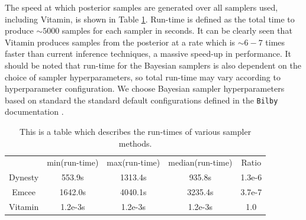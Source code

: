 \documentclass[%
showpacs,
 amsmath,amssymb,
 aps,
 twocolumn,
 prl,
 reprint,
floatfix,
]{revtex4-1}
\newcommand{\chris}[1]{\textbf{\textcolor{red}{CHRIS: #1}}}
\begin{document}
The speed at which posterior samples are generated over all samplers used, 
including Vitamin, is shown in Table \ref{Tab:speed}. Run-time is 
defined as the total time to produce $\sim 5000$ samples for each 
sampler in seconds. It can be clearly seen that Vitamin produces 
samples from the posterior at a rate which is $\sim 6 - 7$ times 
faster than current inference techniques, a massive speed-up 
in performance. It should be noted 
that run-time for the Bayesian samplers is also dependent on 
the choice of sampler hyperparameters, so total run-time may 
vary according to hyperparameter configuration. We choose Bayesian sampler 
hyperparameters based on standard the standard default configurations 
defined in the \texttt{Bilby} documentation \cite{1811.02042}. 
 


%
% 
\begin{table}
 \begin{center}
   \caption{This is a table which describes the run-times of 
   various sampler methods.}
   \begin{tabular}{ |c|c|c|c|c| }
   \hline
    & min(run-time) & max(run-time) & median(run-time) & Ratio \\ 
   Dynesty & 553.9s & 1313.4s & 935.8s & 1.3e-6 \\ 
   Emcee & 1642.0s & 4040.1s & 3235.4s & 3.7e-7 \\
   Vitamin & 1.2e-3s & 1.2e-3s & 1.2e-3s & 1.0 \\ 
   \hline
  \end{tabular}
  \label{Tab:speed}
 \end{center}
\end{table}
\end{document}
